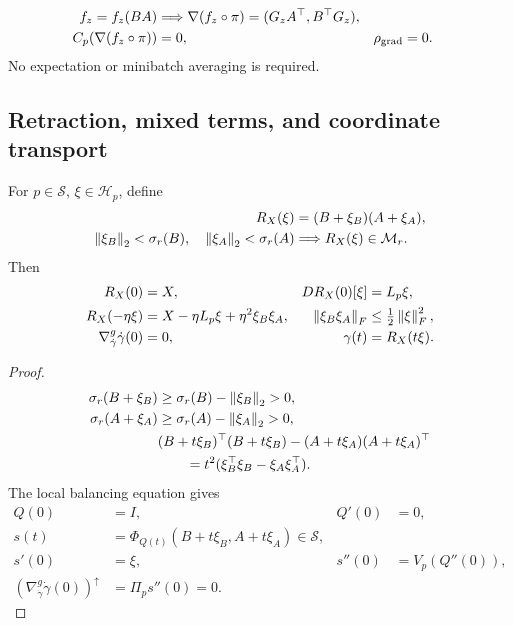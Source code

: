\begin{corollary}
\label{cor:raw-horizontal}
\begin{align}
f_z=f_z(BA)&\Longrightarrow
\nabla(f_z\circ\pi)=(G_zA^\top,B^\top G_z),\\
C_p(\nabla(f_z\circ\pi))&=0,&\rho_{\rm grad}&=0.
\end{align}
No expectation or minibatch averaging is required.
\end{corollary}

\subsection{Retraction, mixed terms, and coordinate transport}
\begin{proposition}
\label{prop:second-order-retraction}
For $p\in\mathcal S$, $\xi\in\mathcal H_p$, define
\begin{align}
R_X(\xi)&=(B+\xi_B)(A+\xi_A),\\
\left\lVert\xi_B\right\rVert_2<\sigma_r(B),\quad\left\lVert\xi_A\right\rVert_2<\sigma_r(A)
&\Longrightarrow R_X(\xi)\in\mathcal M_r .
\end{align}
Then
\begin{align}
R_X(0)&=X,&DR_X(0)[\xi]&=L_p\xi,\\
R_X(-\eta\xi)&=X-\eta L_p\xi+\eta^2\xi_B\xi_A,&
\left\lVert\xi_B\xi_A\right\rVert_F&\leq\tfrac12\left\lVert\xi\right\rVert_F^2,\\
\nabla^g_{\dot\gamma}\dot\gamma(0)&=0,&
\gamma(t)&=R_X(t\xi).
\label{eq:rigid-retraction}
\end{align}
\end{proposition}
\begin{proof}
\begin{align}
\sigma_r(B+\xi_B)&\geq\sigma_r(B)-\left\lVert\xi_B\right\rVert_2>0,\\
\sigma_r(A+\xi_A)&\geq\sigma_r(A)-\left\lVert\xi_A\right\rVert_2>0,\\
&(B+t\xi_B)^\top(B+t\xi_B)
 -(A+t\xi_A)(A+t\xi_A)^\top\notag\\
&\qquad=t^2(\xi_B^\top\xi_B-\xi_A\xi_A^\top).
\end{align}
The local balancing equation gives
\begin{align}
Q(0)&=I,&Q'(0)&=0,\\
s(t)&=\Phi_{Q(t)}(B+t\xi_B,A+t\xi_A)\in\mathcal S,\\
s'(0)&=\xi,&s''(0)&=V_p(Q''(0)),\\
\left(\nabla^g_{\dot\gamma}\dot\gamma(0)\right)^\uparrow
&=\Pi_p s''(0)=0.
\end{align}
\end{proof}

